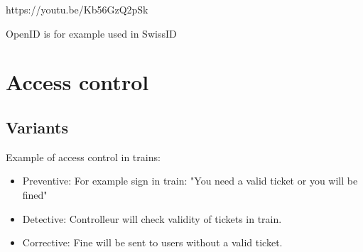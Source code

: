 \documentclass[12pt]{article}
\begin{document}
https://youtu.be/Kb56GzQ2pSk

OpenID is for example used in SwissID

\section*{Access control}
\subsection*{Variants}
Example of access control in trains:
\begin{itemize}
    \item Preventive: For example sign in train: "You need a valid ticket or you will be fined"
    \item Detective: Controlleur will check validity of tickets in train.
    \item Corrective: Fine will be sent to users without a valid ticket.
\end{itemize}
\end{document}
